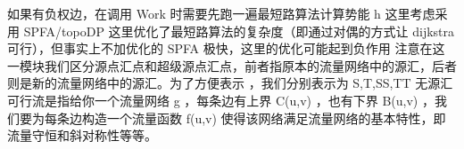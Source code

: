 \markdownRendererInterblockSeparator
{}\markdownRendererInterblockSeparator
{}
\markdownRendererSectionEnd \markdownRendererSectionBegin
{}\markdownRendererInterblockSeparator
{}\markdownRendererInterblockSeparator
{}
\markdownRendererSectionEnd 
\markdownRendererSectionEnd \markdownRendererSectionBegin
{}\markdownRendererInterblockSeparator
{}如果有负权边，在调用\markdownRendererDollarSign{} Work \markdownRendererDollarSign{}时需要先跑一遍最短路算法计算势能\markdownRendererDollarSign{} h \markdownRendererDollarSign{}\markdownRendererParagraphSeparator
{}这里考虑采用\markdownRendererDollarSign{} SPFA/topoDP \markdownRendererDollarSign{}\markdownRendererParagraphSeparator
{}这里优化了最短路算法的复杂度（即通过对偶的方式让\markdownRendererDollarSign{} dijkstra \markdownRendererDollarSign{}可行），但事实上不加优化的\markdownRendererDollarSign{} SPFA \markdownRendererDollarSign{}极快，这里的优化可能起到负作用\markdownRendererInterblockSeparator
{}\markdownRendererSectionBegin
{}\markdownRendererInterblockSeparator
{}\markdownRendererInterblockSeparator
{}
\markdownRendererSectionEnd \markdownRendererSectionBegin
{}\markdownRendererInterblockSeparator
{}\markdownRendererInterblockSeparator
{}
\markdownRendererSectionEnd 
\markdownRendererSectionEnd \markdownRendererSectionBegin
{}\markdownRendererInterblockSeparator
{}注意在这一模块我们区分源点汇点和超级源点汇点，前者指原本的流量网络中的源汇，后者则是新的流量网络中的源汇。为了方便表示 ，我们分别表示为\markdownRendererDollarSign{} S,T,SS,TT \markdownRendererDollarSign{}\markdownRendererInterblockSeparator
{}\markdownRendererSectionBegin
{}\markdownRendererInterblockSeparator
{}无源汇可行流是指给你一个流量网络\markdownRendererDollarSign{} g \markdownRendererDollarSign{}，每条边有上界\markdownRendererDollarSign{} C(u,v) \markdownRendererDollarSign{}，也有下界\markdownRendererDollarSign{} B(u,v) \markdownRendererDollarSign{}，我们要为每条边构造一个流量函数\markdownRendererDollarSign{} f(u,v) \markdownRendererDollarSign{}使得该网络满足流量网络的基本特性，即流量守恒和斜对称性等等。\markdownRendererParagraphSeparator
